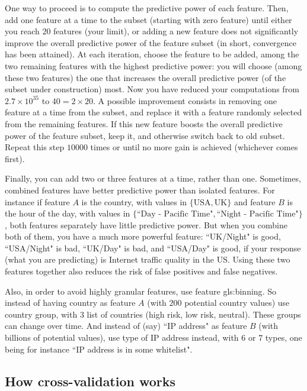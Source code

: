 \documentclass[oneside,10pt]{book}
\begin{document}
One way to proceed is to compute the predictive power of each feature. Then, add one feature at a time to the subset (starting with zero feature) until either you reach
$20$ features (your limit), or adding a new feature does not significantly improve the overall predictive power of the feature subset (in short, convergence has been attained). At each iteration, choose the feature to be added, among the two remaining features with the highest predictive power: you will choose (among these two features) the one that increases the overall predictive power (of the subset under construction) most. Now you have reduced your computations from
$2.7 \times 10^{35}$ to $40 = 2 \times 20$. A possible improvement  consists in removing one feature at a time from the subset, and replace it with a feature randomly selected from the remaining features. If this new feature boosts the overall predictive power of the feature subset, keep it, and otherwise switch back to old subset. Repeat this step $\num{10000}$ times or until no more gain is achieved (whichever comes first).

Finally, you can add two or three features at a time, rather than one. Sometimes, combined features have better predictive power than isolated features. For instance if feature $A$ is the country, with values in $\{\text{USA}, \text{UK}\}$ and feature $B$ is the hour of the day, with values in $\{\text{``Day - Pacific Time"}, \text{``Night - Pacific Time"}\}$, both features separately have little predictive power. But when you combine both of them, you have a much more powerful feature:
``UK/Night" is good, ``USA/Night" is bad, ``UK/Day" is bad, and ``USA/Day" is good, if your response (what you are predicting) is Internet traffic quality in the US. Using these two features together also reduces the risk of false positives and false negatives.

Also, in order to avoid highly granular features, use feature \gls{gls:binning}. So instead of having country as feature $A$ (with $200$ potential country values) use country group, with 3 list of countries (high risk, low risk, neutral). These groups can change over time. And instead of (say)
 ``IP address" as feature $B$ (with billions of potential values), use type of IP address instead, with $6$ or $7$ types, one being for instance ``IP address is in some whitelist".


\subsection{How cross-validation works}
\end{document}
